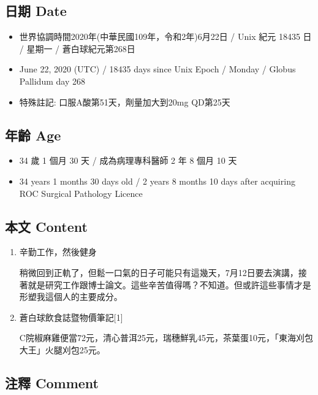 \documentclass[a5paper, 11pt
]{book}
\providecommand{\tightlist}{%
  \setlength{\itemsep}{0pt}\setlength{\parskip}{0pt}}
\begin{document}
\hypertarget{ux65e5ux671f-date-21}{%
\subsection{日期 Date}\label{ux65e5ux671f-date-21}}

\begin{itemize}
\tightlist
\item
  世界協調時間2020年(中華民國109年，令和2年)6月22日 / Unix 紀元 18435 日
  / 星期一 / 蒼白球紀元第268日
\item
  June 22, 2020 (UTC) / 18435 days since Unix Epoch / Monday / Globus
  Pallidum day 268
\item
  特殊註記: 口服A酸第51天，劑量加大到20mg QD第25天
\end{itemize}

\hypertarget{ux5e74ux9f61-age-21}{%
\subsection{年齡 Age}\label{ux5e74ux9f61-age-21}}

\begin{itemize}
\tightlist
\item
  34 歲 1 個月 30 天 / 成為病理專科醫師 2 年 8 個月 10 天
\item
  34 years 1 months 30 days old / 2 years 8 months 10 days after
  acquiring ROC Surgical Pathology Licence
\end{itemize}

\hypertarget{ux672cux6587-content-21}{%
\subsection{本文 Content}\label{ux672cux6587-content-21}}

\begin{enumerate}
\def\labelenumi{\arabic{enumi}.}
\item
  辛勤工作，然後健身

  稍微回到正軌了，但鬆一口氣的日子可能只有這幾天，7月12日要去演講，接著就是研究工作跟博士論文。這些辛苦值得嗎？不知道。但或許這些事情才是形塑我這個人的主要成分。
\item
  蒼白球飲食誌暨物價筆記{[}1{]}

  C院椒麻雞便當72元，清心普洱25元，瑞穗鮮乳45元，茶葉蛋10元，「東海刈包大王」火腿刈包25元。
\end{enumerate}

\hypertarget{ux6ce8ux91cb-comment-21}{%
\subsection{注釋 Comment}\label{ux6ce8ux91cb-comment-21}}
\end{document}
